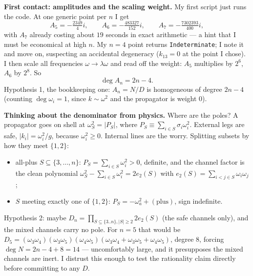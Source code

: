 \documentclass[11pt]{article}
\begin{document}
\medskip
\noindent\textbf{First contact: amplitudes and the scaling weight.}
My first script just runs the code. At one generic point per $n$ I get
\[
A_5=-\tfrac{2349}{4}i,\qquad A_6=-\tfrac{483327}{152}i,\qquad A_7=-\tfrac{7302393}{400}i,
\]
with $A_7$ already costing about $19$ seconds in exact arithmetic --- a hint that I must be
economical at high $n$. My $n=4$ point returns \texttt{Indeterminate}; I note it and move on,
suspecting an accidental degeneracy ($k_{13}=0$ at the point I chose). I then scale all
frequencies $\omega\to\lambda\omega$ and read off the weight: $A_5$ multiplies by $2^6$,
$A_6$ by $2^8$. So
\[
\deg A_n = 2n-4 .
\]
Hypothesis 1, the bookkeeping one: $A_n=N/D$ is homogeneous of degree $2n-4$ (counting
$\deg\omega_i=1$, since $k\sim\omega^2$ and the propagator is weight $0$).

\medskip
\noindent\textbf{Thinking about the denominator from physics.}
Where are the poles? A propagator goes on shell at $\omega_S^2=|P_S|$, where
$P_S\equiv\sum_{i\in S}\sigma_i\omega_i^2$. External legs are safe, $|k_i|=\omega_i^2/g$,
because $\omega_i^2\ge0$. Internal lines are the worry. Splitting subsets by how they meet
$\{1,2\}$:
\begin{itemize}
\item all-plus $S\subseteq\{3,\dots,n\}$: $P_S=\sum_{i\in S}\omega_i^2>0$, definite, and the
channel factor is the clean polynomial $\omega_S^2-\sum_{i\in S}\omega_i^2=2e_2(S)$ with
$e_2(S)=\sum_{i<j\in S}\omega_i\omega_j$;
\item $S$ meeting exactly one of $\{1,2\}$: $P_S=-\omega_a^2+(\text{plus})$, sign indefinite.
\end{itemize}
Hypothesis 2: maybe $D_n=\prod_{S\subseteq\{3..n\},|S|\ge2}2e_2(S)$ (the safe channels only),
and the mixed channels carry no pole. For $n=5$ that would be
$D_5=(\omega_3\omega_4)(\omega_3\omega_5)(\omega_4\omega_5)(\omega_3\omega_4+\omega_3\omega_5+\omega_4\omega_5)$,
degree $8$, forcing $\deg N=2n-4+8=14$ --- uncomfortably large, and it presupposes the
mixed channels are inert. I distrust this enough to test the rationality claim directly
before committing to any $D$.
\end{document}
